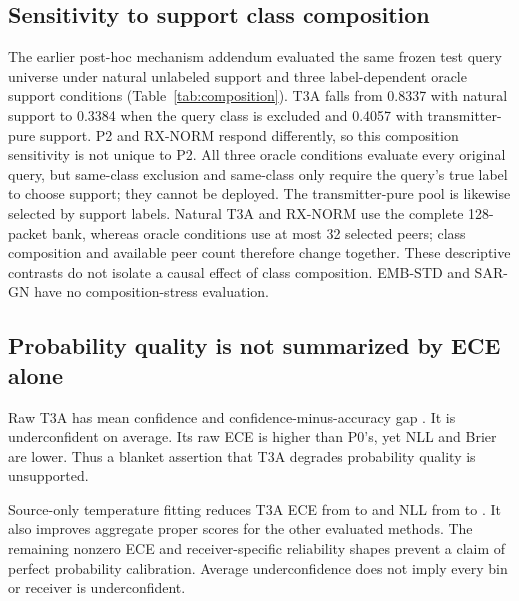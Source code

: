 \subsection{Sensitivity to support class composition}
The earlier post-hoc mechanism addendum evaluated the same frozen test query universe under natural unlabeled support and three label-dependent oracle support conditions (Table~\ref{tab:composition}). T3A falls from 0.8337 with natural support to 0.3384 when the query class is excluded and 0.4057 with transmitter-pure support. P2 and RX-NORM respond differently, so this composition sensitivity is not unique to P2. All three oracle conditions evaluate every original query, but same-class exclusion and same-class only require the query's true label to choose support; they cannot be deployed. The transmitter-pure pool is likewise selected by support labels. Natural T3A and RX-NORM use the complete 128-packet bank, whereas oracle conditions use at most 32 selected peers; class composition and available peer count therefore change together. These descriptive contrasts do not isolate a causal effect of class composition. EMB-STD and SAR-GN have no composition-stress evaluation.

\begin{table}[t]\centering
\caption{POST-HOC ORACLE COMPOSITION DIAGNOSTIC. Receiver-equal macro-F1 across 32 receivers and five seeds; all rows use the same frozen query universe with 100\% coverage. Natural support uses a label-free 128-packet bank. Oracle conditions select at most 32 peers using target labels; the same-class conditions require each query's true label and are non-deployable. EMB-STD and SAR-GN: NOT EVALUATED. Detailed provenance is in the supplement.}
\label{tab:composition}
\end{table}
\subsection{Probability quality is not summarized by ECE alone}
Raw T3A has mean confidence  and confidence-minus-accuracy gap . It is underconfident on average. Its raw ECE is higher than P0's, yet NLL and Brier are lower. Thus a blanket assertion that T3A degrades probability quality is unsupported.

Source-only temperature fitting reduces T3A ECE from  to  and NLL from  to . It also improves aggregate proper scores for the other evaluated methods. The remaining nonzero ECE and receiver-specific reliability shapes prevent a claim of perfect probability calibration. Average underconfidence does not imply every bin or receiver is underconfident.

